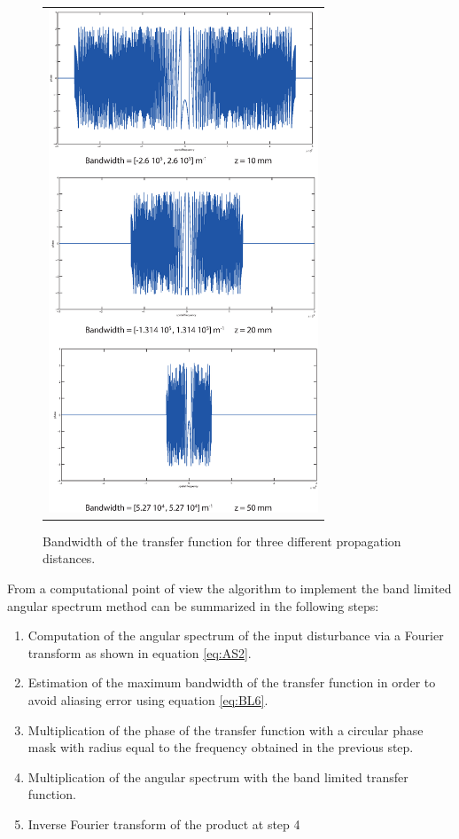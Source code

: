  \begin{figure}[H]
 	\begin{center}
 		\begin{tabular}{c}
 				\includegraphics[height=15cm]{phaseHBL.eps}
 		\end{tabular}
 	\end{center}
 	\caption { \label{fig:bandlimitedH} 
 		Bandwidth of the transfer function for three different propagation distances. }
 \end{figure} 
 From a computational point of view the algorithm to implement the band limited angular spectrum method can be summarized in the following steps:
 \begin{enumerate}
		\item Computation of the angular spectrum of the input disturbance via a Fourier transform as shown in equation \ref{eq:AS2}.
		\item Estimation of the maximum bandwidth of the transfer function in order to avoid aliasing error using equation \ref{eq:BL6}.
		\item Multiplication of the phase of the transfer function with a circular phase mask with radius equal to the frequency obtained in the previous step.
		\item Multiplication of the angular spectrum with the band limited transfer function.
		\item Inverse Fourier transform of the product at step 4 
 \end{enumerate}

